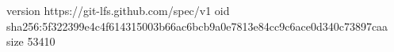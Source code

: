 version https://git-lfs.github.com/spec/v1
oid sha256:5f322399e4c4f614315003b66ac6bcb9a0e7813e84cc9c6ace0d340c73897caa
size 53410
